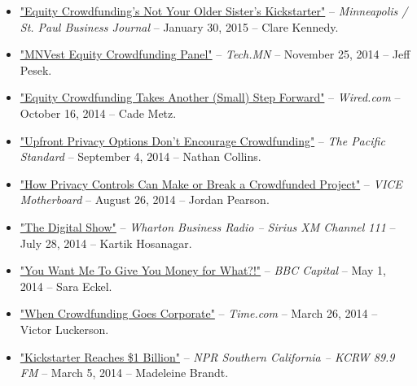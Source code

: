 \documentclass[10.5pt,letterpaper,sans]{moderncv}        %
\begin{document}
\begin{itemize}
\item \textcolor{gray}{\href{http://www.bizjournals.com/twincities/print-edition/2015/01/30/equity-crowdfunding-gordon-burtch.html}{"Equity Crowdfunding's Not Your Older Sister's Kickstarter"}} -- \textit{Minneapolis / St. Paul Business Journal} -- January 30, 2015 -- Clare Kennedy.

\item \textcolor{gray}{\href{http://tech.mn/news/2014/11/25/video-mnvest-equity-crowdfunding-panel/}{"MNVest Equity Crowdfunding Panel"}} -- \textit{Tech.MN} -- November 25, 2014 -- Jeff Pesek.

\item \textcolor{gray}{\href{http://www.wired.com/2014/10/equity-crowdfunding-takes-another-small-step-forward/}{"Equity Crowdfunding Takes Another (Small) Step Forward"}} -- \textit{Wired.com} -- October 16, 2014 -- Cade Metz.

\item \textcolor{gray}{\href{http://www.psmag.com/navigation/nature-and-technology/privacy-doesnt-encourage-crowdfunding-90061/}{"Upfront Privacy Options Don't Encourage Crowdfunding"}} -- \textit{The Pacific Standard} -- September 4, 2014 -- Nathan Collins.

\item \textcolor{gray}{\href{http://motherboard.vice.com/en_ca/read/how-privacy-controls-can-make-or-break-a-crowdfunded- project}{"How Privacy Controls Can Make or Break a Crowdfunded Project"}} -- \textit{VICE Motherboard} -- August 26, 2014 -- Jordan Pearson.

\item \textcolor{gray}{\href{http://www.siriusxm.com/businessradio}{"The Digital Show"}} -- \textit{Wharton Business Radio -- Sirius XM Channel 111} -- July 28, 2014 -- Kartik Hosanagar.

\item \textcolor{gray}{\href{http://www.bbc.com/capital/story/20140501-you-want-money-for-what}{"You Want Me To Give You Money for What?!"}} -- \textit{BBC Capital} -- May 1, 2014 -- Sara Eckel.

\item \textcolor{gray}{\href{http://time.com/39271/oculus-facebook-kickstarter-backlash/}{"When Crowdfunding Goes Corporate"}} -- \textit{Time.com} -- March 26, 2014 -- Victor Luckerson.

\item \textcolor{gray}{\href{http://www.kcrw.com/etc/programs/pp/pp140305vaping_chevron_in_ec}{"Kickstarter Reaches \$1 Billion"}} -- \textit{NPR Southern California -- KCRW 89.9 FM} -- March 5, 2014 -- Madeleine Brandt.


\end{itemize}
\end{document}
